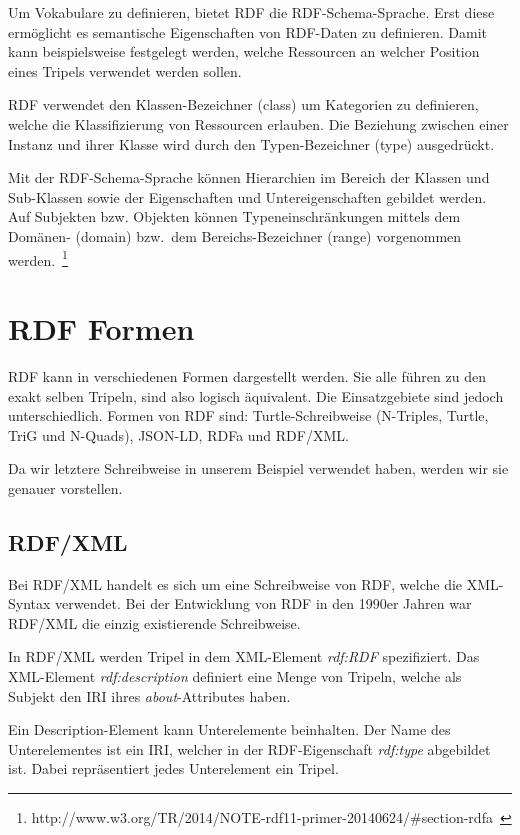 Um Vokabulare zu definieren, bietet RDF die RDF-Schema-Sprache. Erst diese ermöglicht es semantische Eigenschaften von RDF-Daten zu definieren. Damit kann beispielsweise festgelegt werden, welche Ressourcen an welcher Position eines Tripels verwendet werden sollen.

RDF verwendet den Klassen-Bezeichner (class) um Kategorien zu definieren, welche die Klassifizierung von Ressourcen erlauben. Die Beziehung zwischen einer Instanz und ihrer Klasse wird durch den Typen-Bezeichner (type) ausgedrückt. 

Mit der RDF-Schema-Sprache können Hierarchien im Bereich der Klassen und Sub-Klassen sowie der Eigenschaften und Untereigenschaften gebildet werden. Auf Subjekten bzw. Objekten können Typeneinschränkungen mittels dem Domänen- (domain) bzw.\ dem Bereichs-Bezeichner (range) vorgenommen werden.~\footnote{http://www.w3.org/TR/2014/NOTE-rdf11-primer-20140624/\#section-rdfa~\cite{w3rdf}}

\section{RDF Formen}
\label{sec:rdf_rdf_formen}
RDF kann in verschiedenen Formen dargestellt werden. Sie alle führen zu den exakt selben Tripeln, sind also logisch äquivalent. Die Einsatzgebiete sind jedoch unterschiedlich.
Formen von RDF sind: Turtle-Schreibweise (N-Triples, Turtle, TriG und N-Quads), JSON-LD, RDFa und RDF/XML.\@

Da wir letztere Schreibweise in unserem Beispiel verwendet haben, werden wir sie genauer vorstellen.

\subsection{RDF/XML}
\label{sec:rdf_rdf_formen_xmlRdf}
Bei RDF/XML handelt es sich um eine Schreibweise von RDF, welche die XML-Syntax verwendet. Bei der Entwicklung von RDF in den 1990er Jahren war RDF/XML die einzig existierende Schreibweise.

In RDF/XML werden Tripel in dem XML-Element \textit{rdf:RDF} spezifiziert. Das XML-Element \textit{rdf:description} definiert eine Menge von Tripeln, welche als Subjekt den IRI ihres \textit{about}-Attributes haben.

Ein Description-Element kann Unterelemente beinhalten. Der Name des Unterelementes ist ein IRI, welcher in der RDF-Eigenschaft \textit{rdf:type} abgebildet ist. Dabei repräsentiert jedes Unterelement ein Tripel.

